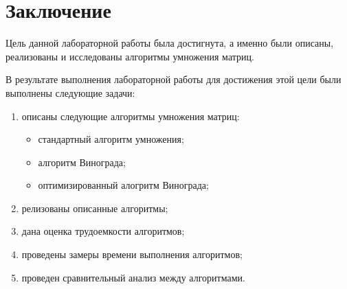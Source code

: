 \chapter*{Заключение}

Цель данной лабораторной работы была достигнута, а именно были описаны, реализованы и исследованы алгоритмы умножения матриц.

В результате выполнения лабораторной работы для достижения этой цели были выполнены следующие задачи:
\begin{enumerate}
    \item описаны следующие алгоритмы умножения матриц:
        \begin{itemize}
            \item стандартный алгоритм умножения;
            \item алгоритм Винограда;
            \item оптимизированный алогритм Винограда;
        \end{itemize}
    \item релизованы описанные алгоритмы;
    \item дана оценка трудоемкости алгоритмов;
    \item проведены замеры времени выполнения алгоритмов;
    \item проведен сравнительный анализ между алгоритмами.
\end{enumerate}